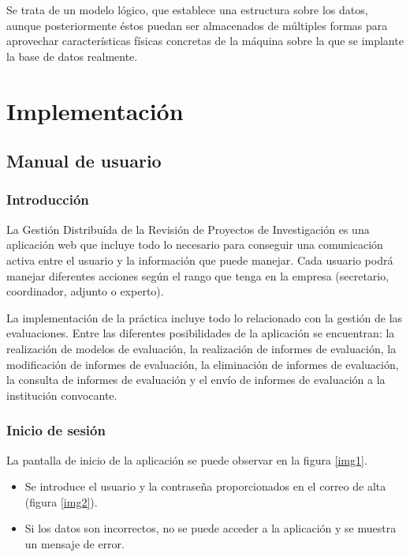 \documentclass[12pt,a4paper,titlepage,spanish,twoside]{book}
\begin{document}
Se trata de un modelo lógico, que establece una
estructura sobre los datos, aunque posteriormente éstos puedan ser almacenados 
de múltiples formas para aprovechar características físicas concretas de la 
máquina sobre la que se implante la base de datos realmente.

\newpage
{}

\part{Implementación}
\chapter{Manual de usuario}
\section{Introducción}
La Gestión Distribuída de la Revisión de Proyectos de Investigación es una
aplicación web que incluye todo lo necesario para conseguir una comunicación 
activa entre el usuario y la información que puede manejar. Cada usuario podrá 
manejar diferentes acciones según el rango que tenga en la empresa (secretario,
coordinador, adjunto o experto).

La implementación de la práctica incluye todo lo relacionado con la gestión de
las e\-va\-lua\-cio\-nes. Entre las diferentes posibilidades de la aplicación se
encuentran: la realización de modelos de evaluación, la realización de informes
de evaluación, la modificación de informes de evaluación, la eliminación de 
informes de evaluación, la consulta de informes de evaluación y el envío de 
informes de evaluación a la institución convocante.

\section{Inicio de sesión}
La pantalla de inicio de la aplicación se puede observar en la figura
\ref{img1}.


\begin{itemize}
\item Se introduce el usuario y la contraseña proporcionados en el correo de 
alta (figura \ref{img2}).


\item Si los datos son incorrectos, no se puede acceder a la aplicación y se
  muestra un mensaje de error. 
\end{itemize}
\end{document}
